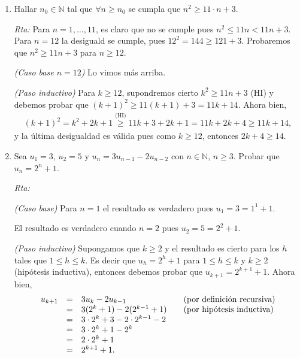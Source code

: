 \documentclass[a4paper,12pt,twoside,spanish,reqno]{amsbook}
\numberwithin{equation}{section}
\newcommand{\rta}{\noindent\textit{Rta: }}
\begin{document}
\begin{enumerate}
\begin{enumerate}
        
        \end{enumerate}
        
        
        \item Hallar $n_0 \in {\mathbb N}$ tal que $\forall n \ge n_0$ se cumpla que $n^2 \ge 11 \cdot n + 3$.
        
        \rta Para $n=1,\ldots,11$,  es claro que no se cumple pues $n^2 \le 11n < 11n +3$. Para $n =12$ la desiguald se cumple, pues $12^2 = 144 \ge 121+3$.   Probaremos  que $n^2 \ge 11  n + 3$ para $n\ge 12$. 
        
            \textit{(Caso base $n=12$) } Lo vimos más arriba.
            
            \textit{(Paso inductivo) }  Para  $k \ge 12$,  supondremos cierto $k^2 \ge 11  n + 3$ (HI) y debemos probar que $(k+1)^2 \ge 11  (k+1) + 3 =11k +14$. Ahora bien, 
            \begin{align*}
                (k+1)^2 = k^2+2k+1 \overset{\text{(HI)}}{\ge} 11k+3 +2k+1 = 11k + 2k+ 4 \ge 11k +14, 
            \end{align*}
            y la última desigualdad es válida pues como  $k\ge 12$,  entonces $2k+ 4 \ge 14$.
        
        
        \item Sea $u_1=3$, $u_2=5$ y $u_n=3 u_{n-1} - 2 u_{n-2}$ con $n\in \mathbb N$, $n\geq 3$.
        Probar que $u_n=2^n+1$.
        
        \rta
        
        \textit{(Caso  base) }  Para $n=1$ el resultado es verdadero pues $u_1 =3 = 1^1 +1$. 
        
        El resultado es verdadero cuando  $n=2$ pues $u_2 = 5 =2^2+1$.
        
        {\it (Paso  inductivo)} Supongamos que $k \ge 2$ y el resultado  es cierto para los $h$ tales que  $1 \le h \le k$. Es decir que $u_h = 2^h+1$ para $1 \le h \le k$ y $k \ge 2$ (hipótesis inductiva),  entonces debemos probar que $u_{k+1} = 2^{k+1}+1$. Ahora bien, 
        $$
        \begin{matrix} u_{k+1} &=& 3u_k -2u_{k-1} \hfill &\quad \text{(por definición recursiva)} \hfill \\
        &=& 3(2^k+1)-2(2^{k-1}+1) \hfill &\quad \text{(por hipótesis inductiva})\hfill \\
        &=& 3\cdot 2^k+3-2\cdot 2^{k-1}-2 \hfill & \\
        &=& 3\cdot 2^k+1- 2^{k} \hfill & \\
        &=& 2\cdot 2^k+1 \hfill & \\
        &=& 2^{k+1}+1. \hfill & 
        \end{matrix}
        $$


\end{enumerate}
\end{document}
